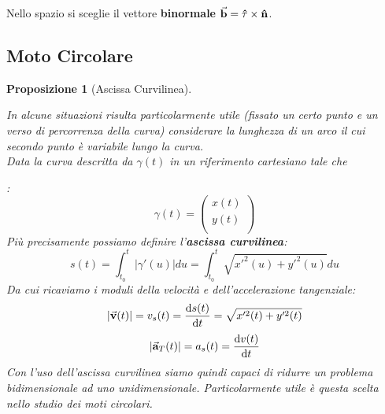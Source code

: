 \documentclass{article}
\newtheorem{prop}[defn]{Proposizione}
\newcommand{\note}{\noindent {\quad \bf \underline{Osservazione:}} \quad}
\renewcommand{\a}{\va{a}}
\renewcommand{\b}{\va{b}}
\renewcommand{\v}{\va{v}}
\newcommand{\tauvs}{\vu{\tau}}
\newcommand{\normvs}{\vu{n}}
\begin{document}
\note Nello spazio si sceglie il vettore \textbf{binormale} $\b=\tauvs\times\normvs$.

\subsection{Moto Circolare}

\begin{prop}[Ascissa Curvilinea]
\hypertarget{ascissacurv}{
In alcune situazioni risulta particolarmente utile (fissato un certo punto e un verso di percorrenza della curva) considerare la lunghezza di un arco il cui secondo punto è variabile lungo la curva.\\
Data la curva descritta da $\gamma(t)$ in un riferimento cartesiano tale che}:
\[\gamma(t)=\begin{pmatrix}x(t)\\y(t)\\\end{pmatrix}\] 
Più precisamente possiamo definire l'\textbf{ascissa curvilinea}:
\[s(t)=\int_{t_0}^t|\gamma'(u)|du=\int_{t_0}^t \sqrt{x'^2(u)+y'^2(u)}du\]
Da cui ricaviamo i moduli della velocità e dell'accelerazione tangenziale:
\[|\v(t)|=v_s(t)=\dv{s(t)}{t}=\sqrt{x'^2(t)+y'^2(t)}\]
\[|\a_T(t)|=a_s(t)=\dv{v(t)}{t}\]
Con l'uso dell'ascissa curvilinea siamo quindi capaci di ridurre un problema bidimensionale ad uno unidimensionale. Particolarmente utile è questa scelta nello studio dei moti circolari.
\end{prop}
\end{document}
